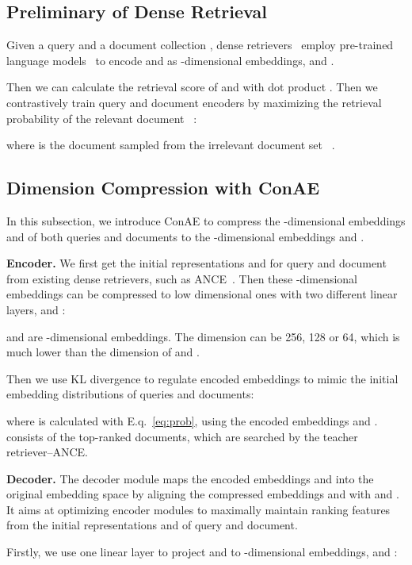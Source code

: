 \documentclass[11pt]{article}
\begin{document}
\subsection{Preliminary of Dense Retrieval}\label{model:preliminary}
Given a query  and a document collection , dense retrievers~\cite{xiong2020dense,xiong2020approximate,karpukhin2020dense} employ pre-trained language models~\cite{devlin2019bert,liu2019roberta} to encode  and  as -dimensional embeddings,  and .

Then we can calculate the retrieval score  of  and  with dot product . Then we contrastively train query and document encoders by maximizing the retrieval probability  of the relevant document ~\cite{xiong2020dense,xiong2020approximate}:

where  is the document sampled from the irrelevant document set ~\cite{karpukhin2020dense,xiong2020approximate}.


\subsection{Dimension Compression with ConAE}\label{model:autoencoder}
In this subsection, we introduce ConAE to compress the -dimensional embeddings  and  of both queries and documents to the -dimensional embeddings  and .

\textbf{Encoder.} We first get the initial representations  and  for query  and document  from existing dense retrievers, such as ANCE~\cite{xiong2020approximate}. Then these -dimensional embeddings can be compressed to low dimensional ones with two different linear layers,  and :

 and  are -dimensional embeddings. The dimension  can be 256, 128 or 64, which is much lower than the dimension  of  and .  

Then we use KL divergence to regulate encoded embeddings to mimic the initial embedding distributions of queries and documents:

where  is calculated with E.q.~\ref{eq:prob}, using the encoded embeddings  and .  consists of the top-ranked documents, which are searched by the teacher retriever--ANCE.
 
\textbf{Decoder.} The decoder module maps the encoded embeddings  and  into the original embedding space by aligning the compressed embeddings  and  with  and . It aims at optimizing encoder modules to maximally maintain ranking features from the initial representations  and  of query and document. 

Firstly, we use one linear layer to project  and  to -dimensional embeddings,  and :
\end{document}
